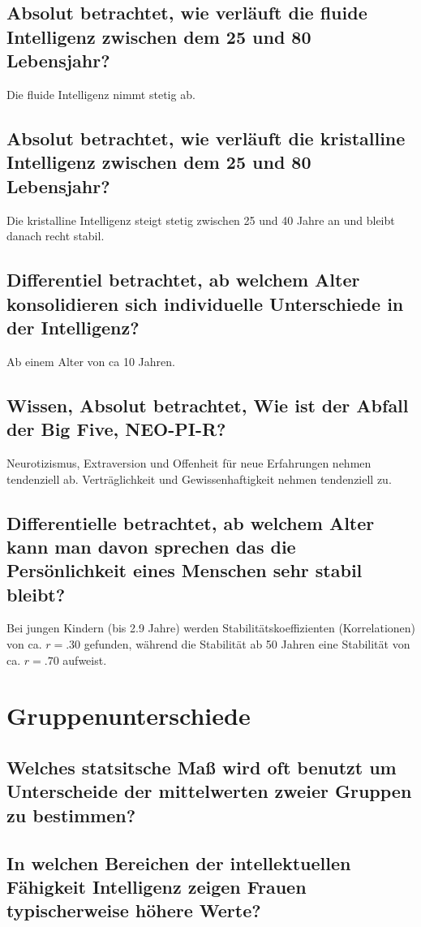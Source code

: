 \documentclass[a6paper,10pt,DIV=40]{scrartcl}
\begin{document}
\subsection{Absolut betrachtet, wie verläuft die fluide Intelligenz zwischen dem 25 und 80 Lebensjahr?}
Die fluide Intelligenz nimmt stetig ab.
\subsection{Absolut betrachtet, wie verläuft die kristalline Intelligenz zwischen dem 25 und 80 Lebensjahr?}
Die kristalline Intelligenz steigt stetig zwischen 25 und 40 Jahre an und bleibt danach recht stabil.
\subsection{Differentiel betrachtet, ab welchem Alter konsolidieren sich individuelle Unterschiede in der Intelligenz?}
Ab einem Alter von ca 10 Jahren.
\subsection{Wissen, Absolut betrachtet, Wie ist der Abfall der Big Five, NEO-PI-R?}
Neurotizismus, Extraversion und Offenheit für neue Erfahrungen nehmen tendenziell ab. Verträglichkeit und Gewissenhaftigkeit nehmen tendenziell zu.
\subsection{Differentielle betrachtet, ab welchem Alter kann man davon sprechen das die Persönlichkeit eines Menschen sehr stabil bleibt?}
Bei jungen Kindern (bis 2.9 Jahre) werden Stabilitätskoeffizienten (Korrelationen) von ca. $r = .30$ gefunden, während die Stabilität ab 50 Jahren eine Stabilität von ca. $r = .70$ aufweist.

\section{Gruppenunterschiede}

\subsection{Welches statsitsche Maß wird oft benutzt um Unterscheide der mittelwerten zweier Gruppen zu bestimmen?}
\subsection{In welchen Bereichen der intellektuellen Fähigkeit Intelligenz zeigen Frauen typischerweise höhere Werte?}
\end{document}
